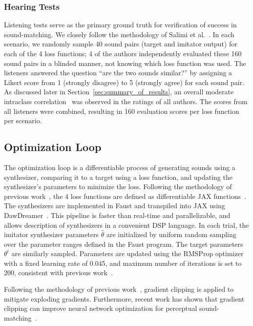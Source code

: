 \documentclass{article}
\newcommand{\anon}[1]{{#1}}
\begin{document}
\subsubsection{Hearing Tests}
Listening tests serve as the primary ground truth for verification of success in sound-matching. We closely follow the methodology of \anon{Salimi et al.}~\cite{salimi2020make}. In each scenario, we randomly sample 40 sound pairs (target and imitator output) for each of the 4 loss functions; 4 of the authors independently evaluated these 160 sound pairs in a blinded manner, not knowing which loss function was used. The listeners answered the question ``are the two sounds similar?'' by assigning a Likert score from 1 (strongly disagree) to 5 (strongly agree) for each sound pair. As discussed later in Section~\ref{sec:summary_of_results}, an overall moderate intraclass correlation~\cite{liljequist2019intraclass} was observed in the ratings of all authors. The scores from all listeners were combined, resulting in 160 evaluation scores per loss function per scenario. 

\subsection{Optimization Loop}
\label{subsec:optimization}
The optimization loop is a differentiable process of generating sounds using a synthesizer, comparing it to a target using a loss function, and updating the synthesizer's parameters to minimize the loss. Following the methodology of previous work~\cite{salimi2025evaluating}, the 4 loss functions are defined as differentiable JAX functions~\cite{deepmind2020jax}. The synthesizers are implemented in Faust and transpiled into JAX using DawDreamer~\cite{braun2024dac}.  This pipeline is faster than real-time and parallelizable, and allows description of synthesizers in a convenient DSP language. In each trial, the imitator synthesizer parameters $\hat{\theta}$ are initialized by uniform random sampling over the parameter ranges defined in the Faust program. The target parameters $\theta^t$ are similarly sampled. Parameters are updated using the RMSProp optimizer with a fixed learning rate of 0.045, and maximum number of iterations is set to 200, consistent with previous work~\cite{salimi2025evaluating}. 

Following the methodology of previous work~\cite{salimi2025evaluating}, gradient clipping is applied to mitigate exploding gradients. Furthermore, recent work has shown that gradient clipping can improve neural network optimization for perceptual sound-matching~\cite{han2025gradient}. 
\end{document}
